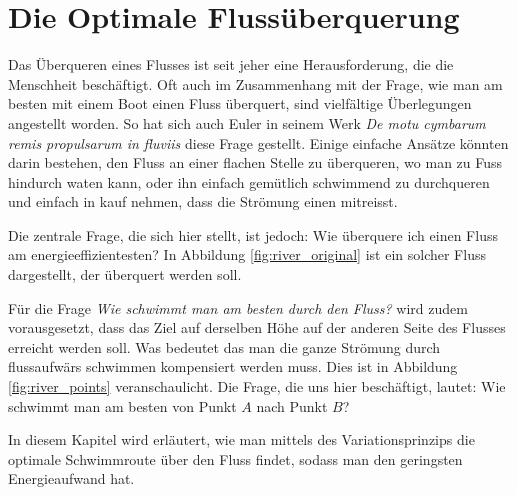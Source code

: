 %
%
%
%

\chapter{Die Optimale Flussüberquerung\label{chapter:schwimmen}}
\begin{refsection}

\noindent
Das Überqueren eines Flusses ist seit jeher eine Herausforderung, die die Menschheit beschäftigt. Oft auch im Zusammenhang mit der Frage, wie man am besten mit einem Boot einen Fluss überquert, sind vielfältige Überlegungen angestellt worden. So hat sich auch Euler in seinem Werk \textit{De motu cymbarum remis propulsarum in fluviis} \cite{schwimmen:Euler_works} diese Frage gestellt. Einige einfache Ansätze könnten darin bestehen, den Fluss an einer flachen Stelle zu überqueren, wo man zu Fuss hindurch waten kann, oder ihn einfach gemütlich schwimmend zu durchqueren und einfach in kauf nehmen, dass die Strömung einen mitreisst.
	
	
Die zentrale Frage, die sich hier stellt, ist jedoch: Wie überquere ich einen Fluss am energieeffizientesten? In Abbildung \ref{fig:river_original} ist ein solcher Fluss dargestellt, der überquert werden soll.

%

Für die Frage \textit{Wie schwimmt man am besten durch den Fluss?} wird zudem vorausgesetzt, dass das Ziel auf derselben Höhe auf der anderen Seite des Flusses erreicht werden soll. Was bedeutet das man die ganze Strömung durch flussaufwärs schwimmen kompensiert werden muss. Dies ist in Abbildung \ref{fig:river_points} veranschaulicht. Die Frage, die uns hier beschäftigt, lautet: Wie schwimmt man am besten von Punkt \(A\) nach Punkt \(B\)?

%

In diesem Kapitel wird erläutert, wie man mittels des Variationsprinzips die optimale Schwimmroute über den Fluss findet, sodass man den geringsten Energieaufwand hat.






\printbibliography[heading=subbibliography]
\end{refsection}

